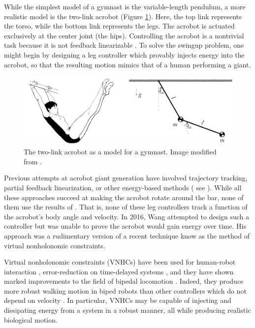\documentclass[journal,twoside,web]{ieeecolor}
\begin{document}
While the simplest model of a gymnast is the variable-length pendulum, a
more realistic model is the two-link acrobot (Figure \ref{fig:acrobot}).
Here, the top link represents the torso, while the bottom link represents
the legs. 
The acrobot is actuated exclusively at the center joint (the hips).
Controlling the acrobot is a nontrivial task because it is not feedback
linearizable \cite{nonlinear_controllers_nonintegrable_acrobot}. 
To solve the swingup problem, one might begin by designing a leg controller
which provably injects energy into the acrobot, so that the resulting motion
mimics that of a human performing a giant.

\begin{figure}
    \centering
    \includegraphics[width=\linewidth]{acrobot_gymnast.png}
    \caption{The two-link acrobot as a model for a gymnast.
    Image modified from \cite{xingbo_thesis}.}
    \label{fig:acrobot}
\end{figure}

Previous attempts at acrobot giant generation have involved
trajectory tracking, partial feedback linearization, or other energy-based
methods
( see
\cite{energy_pumping_robotic_swinging,swingup_giant_acrobot,dynamical_servo_acrobot_vc,control_giant_two_link_gymnastic_robot}
).
While all these approaches succeed at making the acrobot rotate around the
bar, none of them use the results of \cite{pendulum_length_giant_gymnastics}.
That is, none of these leg controllers track a function of the acrobot's body
angle and velocity.
In 2016, Wang attempted to design such a controller \cite{xingbo_thesis}
but was unable to prove the acrobot would gain energy over time.
His approach was a rudimentary version of a recent technique know as the method
of virtual nonholonomic constraints.

Virtual nonholonomic constraints (VNHCs) have been used for human-robot interaction
\cite{vnhc_human_robot_cooperation,psd_based_vnhc_redundant_manipulator,haptic_vnhc},
error-reduction on time-delayed systems \cite{vnhc_time_delay_teleop},
and they have shown marked improvements to the field of bipedal locomotion 
\cite{nhvc_dynamic_walking,
hybrid_zero_dynamics_bipedal_nhvcs,output_nhvc_bipedal_control}.
Indeed, they produce more robust walking motion in biped robots than
other controllers which do not depend on velocity \cite{nhvc_incline_walking}.
In particular, VNHCs may be capable of injecting and
dissipating energy from a system in a robust manner, all while producing
realistic biological motion. 
\end{document}

